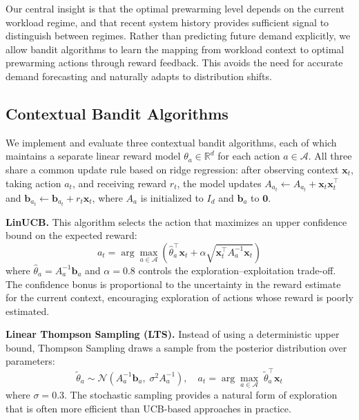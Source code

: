 \documentclass[11pt]{article}
\begin{document}
Our central insight is that the optimal prewarming level depends on the current workload regime, and that recent system history provides sufficient signal to distinguish between regimes. Rather than predicting future demand explicitly, we allow bandit algorithms to learn the mapping from workload context to optimal prewarming actions through reward feedback. This avoids the need for accurate demand forecasting and naturally adapts to distribution shifts.

\subsection{Contextual Bandit Algorithms}

We implement and evaluate three contextual bandit algorithms, each of which maintains a separate linear reward model $\theta_a \in \mathbb{R}^d$ for each action $a \in \mathcal{A}$. All three share a common update rule based on ridge regression: after observing context $\mathbf{x}_t$, taking action $a_t$, and receiving reward $r_t$, the model updates $A_{a_t} \leftarrow A_{a_t} + \mathbf{x}_t \mathbf{x}_t^\top$ and $\mathbf{b}_{a_t} \leftarrow \mathbf{b}_{a_t} + r_t \mathbf{x}_t$, where $A_a$ is initialized to $I_d$ and $\mathbf{b}_a$ to $\mathbf{0}$.

\textbf{LinUCB.} This algorithm selects the action that maximizes an upper confidence bound on the expected reward:
\begin{equation}
    a_t = \arg\max_{a \in \mathcal{A}} \left( \hat{\theta}_a^\top \mathbf{x}_t + \alpha \sqrt{\mathbf{x}_t^\top A_a^{-1} \mathbf{x}_t} \right)
\end{equation}
where $\hat{\theta}_a = A_a^{-1} \mathbf{b}_a$ and $\alpha = 0.8$ controls the exploration--exploitation trade-off. The confidence bonus is proportional to the uncertainty in the reward estimate for the current context, encouraging exploration of actions whose reward is poorly estimated.

\textbf{Linear Thompson Sampling (LTS).} Instead of using a deterministic upper bound, Thompson Sampling draws a sample from the posterior distribution over parameters:
\begin{equation}
    \tilde{\theta}_a \sim \mathcal{N}\left(A_a^{-1} \mathbf{b}_a, \; \sigma^2 A_a^{-1}\right), \quad a_t = \arg\max_{a \in \mathcal{A}} \; \tilde{\theta}_a^\top \mathbf{x}_t
\end{equation}
where $\sigma = 0.3$. The stochastic sampling provides a natural form of exploration that is often more efficient than UCB-based approaches in practice.
\end{document}
